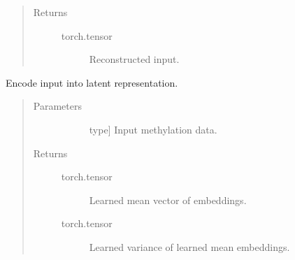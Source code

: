 \documentclass[letterpaper,10pt,english]{sphinxmanual}
\begin{document}
\begin{fulllineitems}
\begin{fulllineitems}
\begin{quote}
\begin{description}
\begin{description}
\end{description}

\item[{Returns}] \leavevmode\begin{description}
\item[{torch.tensor}] \leavevmode
Reconstructed input.

\end{description}

\end{description}\end{quote}

\end{fulllineitems}


\begin{fulllineitems}
\label{\detokenize{index:methylnet.models.TybaltTitusVAE.encode}}
Encode input into latent representation.
\begin{quote}\begin{description}
\item[{Parameters}] \leavevmode\begin{description}
\item[{}] \leavevmode{[}type{]}
Input methylation data.

\end{description}

\item[{Returns}] \leavevmode\begin{description}
\item[{torch.tensor}] \leavevmode
Learned mean vector of embeddings.

\item[{torch.tensor}] \leavevmode
Learned variance of learned mean embeddings.

\end{description}

\end{description}\end{quote}

\end{fulllineitems}



\end{fulllineitems}
\end{document}
